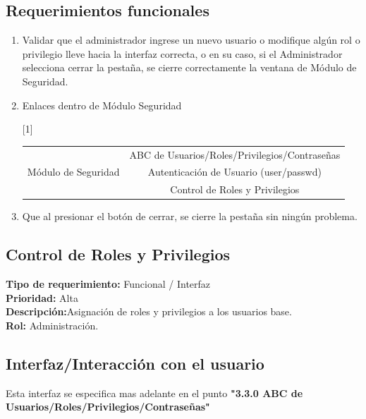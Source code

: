 \documentclass[a4paper,DIV=12]{scrreprt}
\begin{document}
\subsection*{Requerimientos funcionales}
\begin{enumerate}
	\item{Validar que el administrador ingrese un nuevo usuario o modifique algún rol o privilegio lleve hacia la interfaz correcta, o en su caso, si el Administrador  selecciona cerrar la pestaña, se cierre correctamente la ventana de Módulo de Seguridad. }
	\item{Enlaces dentro de Módulo Seguridad}
	
\begin{table}[ht]
\scalebox{1}[1]{%
\begin{tabular}{|c|c|}
\hline
\multirow{3}{*}{Módulo de Seguridad} & ABC de Usuarios/Roles/Privilegios/Contraseñas           \\ \cline{2-2} 
                                   & Autenticación de Usuario (user/passwd) \\ \cline{2-2} 
                                   & Control de Roles y Privilegios  \\ \hline
\end{tabular}%
}
\end{table}

	\item{ Que al presionar el botón de cerrar, se cierre la pestaña sin ningún problema. }
	
\end{enumerate}

\newpage
\setcounter{chapter}{3}
\setcounter{section}{1}
\setcounter{subsection}{-1}
\subsection{Control de Roles y Privilegios}
\noindent
\textbf{Tipo de requerimiento:} Funcional / Interfaz\\
\textbf{Prioridad:} Alta\\
\textbf{Descripción:}Asignación de roles y privilegios a los usuarios base. \\
\textbf{Rol:} Administración.
\subsection*{Interfaz/Interacción con el usuario}
Esta interfaz se especifica mas adelante en el punto \textbf{"3.3.0 ABC de Usuarios/Roles/Privilegios/Contraseñas"}
\end{document}
